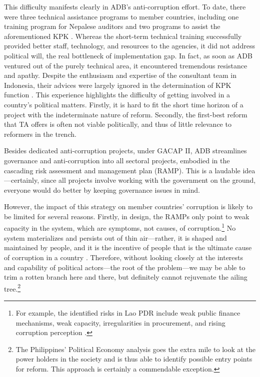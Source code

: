 \documentclass[12pt]{article}
\begin{document}
This difficulty manifests clearly in ADB's anti-corruption effort. To date, there were three technical assistance programs to member countries, including one training program for Nepalese auditors and two programs to assist the aforementioned KPK \citep{ADB2003, ADB2005, ADB2011}. Whereas the short-term technical training successfully provided better staff, technology, and resources to the agencies, it did not address political will, the real bottleneck of implementation gap. In fact, as soon as ADB ventured out of the purely technical area, it encountered tremendous resistance and apathy. Despite the enthusiasm and expertise of the consultant team in Indonesia, their advices were largely ignored in the determination of KPK function \citep{ADB2003, Schutte2012}. This experience highlights the difficulty of getting involved in a country's political matters. Firstly, it is hard to fit the short time horizon of a project with the indeterminate nature of reform. Secondly, the first-best reform that TA offers is often not viable politically, and thus of little relevance to reformers in the trench.

Besides dedicated anti-corruption projects, under GACAP II, ADB streamlines governance and anti-corruption into all sectoral projects, embodied in the cascading risk assessment and management plan (RAMP). This is a laudable idea---certainly, since all projects involve working with the government on the ground, everyone would do better by keeping governance issues in mind.

However, the impact of this strategy on member countries' corruption is likely to be limited for several reasons. Firstly, in design, the RAMPs only point to weak capacity in the system, which are symptoms, not causes, of corruption.\footnote{For example, the identified risks in Lao PDR include weak public finance mechanisms, weak capacity, irregularities in procurement, and rising corruption perception \citep{ADB2011a}.} No system materializes and persists out of thin air---rather, it is shaped and maintained by people, and it is the incentive of people that is the ultimate cause of corruption in a country \citep[6]{ADB2013}. Therefore, without looking closely at the interests and capability of political actors---the root of the problem---we may be able to trim a rotten branch here and there, but definitely cannot rejuvenate the ailing tree.\footnote{The Philippines' Political Economy analysis goes the extra mile to look at the power holders in the society and is thus able to identify possible entry points for reform. This approach is certainly a commendable exception.}
\end{document}
